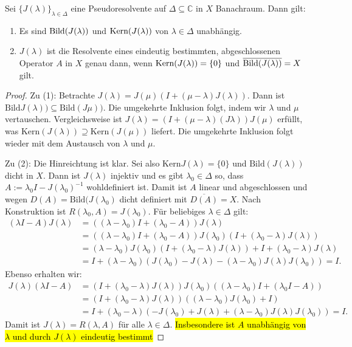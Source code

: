 \begin{satz}
Sei $\{J(\lambda)\}_{\lambda\in\Delta}$ eine Pseudoresolvente auf $\Delta\subseteq\mathbb C$ in $X$ Banachraum. Dann gilt:
\begin{enumerate}
\item Es sind $\textnormal{Bild}(J(\lambda))$ und $\textnormal{Kern}(J(\lambda))$ von $\lambda\in\Delta$ unabhängig.
\item $J(\lambda)$ ist die Resolvente eines eindeutig bestimmten, abgeschlossenen Operator $A$ in $X$ genau dann, wenn $\textnormal{Kern}(J(\lambda))=\{0\}$ und $\overline{\textnormal{Bild}(J(\lambda))}=X$ gilt. 
\end{enumerate}
\end{satz}

\begin{proof}
Zu (1): Betrachte $J(\lambda)=J(\mu)(I+(\mu-\lambda)J(\lambda))$. Dann ist $\text{Bild}J(\lambda))\subseteq \text{Bild}(J\mu))$. Die umgekehrte Inklusion folgt, indem wir $\lambda$ und $\mu$ vertauschen. Vergleichsweise ist $J(\lambda)=(I+(\mu-\lambda)(J\lambda))J(\mu)$ erfüllt, was $\text{Kern}(J(\lambda))\supseteq \text{Kern}(J(\mu))$ liefert. Die umgekehrte Inklusion folgt wieder mit dem Austausch von  $\lambda$ und $\mu$.

\par
Zu (2): Die Hinreichtung ist klar. Sei also $\text{Kern}J(\lambda)=\{0\}$ und $\text{Bild}(J(\lambda))$ dicht in $X$. Dann ist $J(\lambda)$ injektiv und es gibt $\lambda_0\in\Delta$ so, dass $A:=\lambda_0I - J(\lambda_0)^{-1}$ wohldefiniert ist. Damit ist $A$ linear und abgeschlossen und wegen $D(A)=\text{Bild}(J(\lambda_0)$ dicht definiert mit $\overline {D(A)}=X$. Nach Konstruktion ist $R(\lambda_0, A) = J(\lambda_0)$. Für beliebiges $\lambda\in\Delta$ gilt:
\begin{align*}
(\lambda I- A)J(\lambda)
&=((\lambda-\lambda_0)I+(\lambda_0-A))J(\lambda)\\
&=((\lambda-\lambda_0)I+(\lambda_0-A))J(\lambda_0)(I+(\lambda_0-\lambda)J(\lambda))\\
&=(\lambda-\lambda_0)J(\lambda_0)(I+(\lambda_0-\lambda)J(\lambda))+I+(\lambda_0-\lambda)J(\lambda)\\
&=I + (\lambda-\lambda_0)(J(\lambda_0)- J(\lambda)- (\lambda-\lambda_0)J(\lambda)J(\lambda_0))=I.
\end{align*}
Ebenso erhalten wir:
\begin{align*}
J(\lambda)(\lambda I- A)
&=(I+(\lambda_0-\lambda)J(\lambda))J(\lambda_0)((\lambda-\lambda_0)I+(\lambda_0 I- A))\\
&= (I+(\lambda_0 - \lambda)J(\lambda))((\lambda-\lambda_0)J(\lambda_0)+I)\\
&=I+(\lambda_0-\lambda)(-J(\lambda_0)+J(\lambda)+(\lambda-\lambda_0)J(\lambda)J(\lambda_0))=I.
\end{align*}
Damit ist $J(\lambda)=R(\lambda, A)$ für alle $\lambda\in\Delta$. \hl{Insbesondere ist $A$ unabhängig von $\lambda$ und durch $J(\lambda)$ eindeutig bestimmt}
\end{proof}

